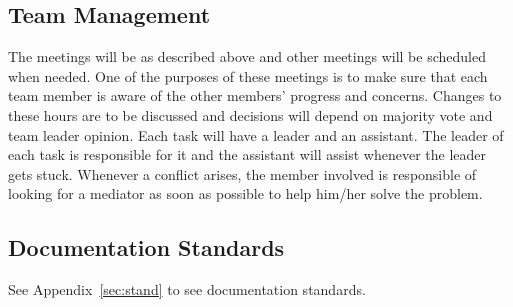 \subsection{Team Management}

The meetings will be as described above and other meetings will be scheduled
when needed. One of the purposes of these meetings is to make sure that each
team member is aware of the other members' progress and concerns. Changes to
these hours are to be discussed and decisions will depend on majority vote and
team leader opinion. Each task will have a leader and an assistant. The leader
of each task is responsible for it and the assistant will assist whenever the
leader gets stuck. Whenever a conflict arises, the member involved is
responsible of looking for a mediator as soon as possible to help him/her solve
the problem.

\subsection{Documentation Standards}
See Appendix~\ref{sec:stand} to see documentation standards.
